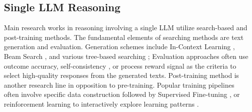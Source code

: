 \subsection{Single LLM Reasoning}
\label{related_work:single_llm}
Main research works in reasoning involving a single LLM utilize search-based and post-training methods. The fundamental elements of searching methods are text generation and evaluation. Generation schemes include In-Context Learning \citep{brown2020language}, Beam Search \citep{graves2012sequence}, and various tree-based searching \citep{snell2024scaling}; Evaluation approaches often use outcome accuracy, self-consistency \citep{wang2022self}, or process reward signal \citep{lightman2023let} as the criteria to select high-quality responses from the generated texts. Post-training method is another research line in opposition to pre-training. Popular training pipelines often involve specific data construction followed by Supervised Fine-tuning \citep{qin2024o1replicationjourneystrategic, ouyang2022training, hui2024qwen2, liu2024deepseek}, or reinforcement learning to interactively explore learning patterns \citep{wang2024openr, zhang2024llamaberrypairwiseoptimizationo1like, r1, xu2025towards}.

